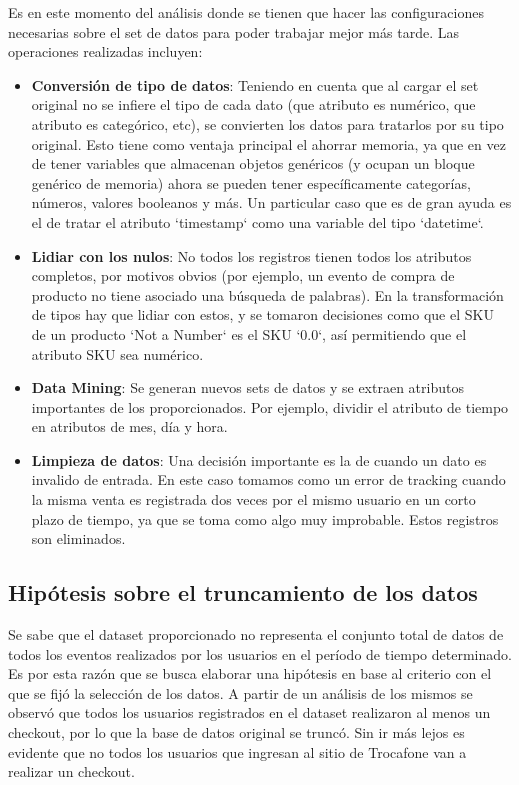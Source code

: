 \documentclass[a4paper]{article}
\begin{document}
Es en este momento del análisis donde se tienen que hacer las configuraciones necesarias sobre el set de datos para poder trabajar mejor más tarde. Las operaciones realizadas incluyen:

\begin{itemize}
\item \textbf{Conversión de tipo de datos}: Teniendo en cuenta que al cargar el set original no se infiere el tipo de cada dato (que atributo es numérico, que atributo es categórico, etc), se convierten los datos para tratarlos por su tipo original. Esto tiene como ventaja principal el ahorrar memoria, ya que en vez de tener variables que almacenan objetos genéricos (y ocupan un bloque genérico de memoria) ahora se pueden tener específicamente categorías, números, valores booleanos y más. Un particular caso que es de gran ayuda es el de tratar el atributo `timestamp` como una variable del tipo `datetime`.
\item \textbf{Lidiar con los nulos}: No todos los registros tienen todos los atributos completos, por motivos obvios (por ejemplo, un evento de compra de producto no tiene asociado una búsqueda de palabras). En la transformación de tipos hay que lidiar con estos, y se tomaron decisiones como que el SKU de un producto `Not a Number` es el SKU `0.0`, así permitiendo que el atributo SKU sea numérico.
\item \textbf{Data Mining}: Se generan nuevos sets de datos y se extraen atributos importantes de los proporcionados. Por ejemplo, dividir el atributo de tiempo en atributos de mes, día y hora.
\item \textbf{Limpieza de datos}: Una decisión importante es la de cuando un dato es invalido de entrada. En este caso tomamos como un error de tracking cuando la misma venta es registrada dos veces por el mismo usuario en un corto plazo de tiempo, ya que se toma como algo muy improbable. Estos registros son eliminados.
\end{itemize}

\subsection{Hipótesis sobre el truncamiento de los datos}

Se sabe que el dataset proporcionado no representa el conjunto total de datos de todos los eventos realizados por los usuarios en el período de tiempo determinado. Es por esta razón que se busca elaborar una hipótesis en base al criterio con el que se fijó la selección de los datos. A partir de un análisis de los mismos se observó que todos los usuarios registrados en el dataset realizaron al menos un checkout, por lo que la base de datos original se truncó. Sin ir más lejos es evidente que no todos los usuarios que ingresan al sitio de Trocafone van a realizar un checkout.
\end{document}
